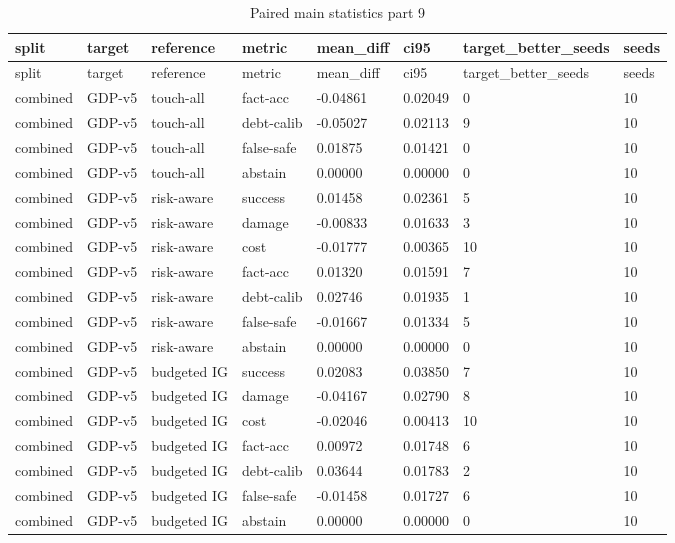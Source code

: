 \documentclass{article}
\begin{document}
\begin{center}
\tiny
\renewcommand{\arraystretch}{0.92}
\setlength{\tabcolsep}{3pt}
\begin{longtable}{llllllll}
\caption{Paired main statistics part 9}\label{tab:paired-main-statistics-9}\\
\toprule
split & target & reference & metric & mean\_diff & ci95 & target\_better\_seeds & seeds \\
\midrule
\endfirsthead
\toprule
split & target & reference & metric & mean\_diff & ci95 & target\_better\_seeds & seeds \\
\midrule
\endhead
combined & GDP-v5 & touch-all & fact-acc & -0.04861 & 0.02049 & 0 & 10 \\
combined & GDP-v5 & touch-all & debt-calib & -0.05027 & 0.02113 & 9 & 10 \\
combined & GDP-v5 & touch-all & false-safe & 0.01875 & 0.01421 & 0 & 10 \\
combined & GDP-v5 & touch-all & abstain & 0.00000 & 0.00000 & 0 & 10 \\
combined & GDP-v5 & risk-aware & success & 0.01458 & 0.02361 & 5 & 10 \\
combined & GDP-v5 & risk-aware & damage & -0.00833 & 0.01633 & 3 & 10 \\
combined & GDP-v5 & risk-aware & cost & -0.01777 & 0.00365 & 10 & 10 \\
combined & GDP-v5 & risk-aware & fact-acc & 0.01320 & 0.01591 & 7 & 10 \\
combined & GDP-v5 & risk-aware & debt-calib & 0.02746 & 0.01935 & 1 & 10 \\
combined & GDP-v5 & risk-aware & false-safe & -0.01667 & 0.01334 & 5 & 10 \\
combined & GDP-v5 & risk-aware & abstain & 0.00000 & 0.00000 & 0 & 10 \\
combined & GDP-v5 & budgeted IG & success & 0.02083 & 0.03850 & 7 & 10 \\
combined & GDP-v5 & budgeted IG & damage & -0.04167 & 0.02790 & 8 & 10 \\
combined & GDP-v5 & budgeted IG & cost & -0.02046 & 0.00413 & 10 & 10 \\
combined & GDP-v5 & budgeted IG & fact-acc & 0.00972 & 0.01748 & 6 & 10 \\
combined & GDP-v5 & budgeted IG & debt-calib & 0.03644 & 0.01783 & 2 & 10 \\
combined & GDP-v5 & budgeted IG & false-safe & -0.01458 & 0.01727 & 6 & 10 \\
combined & GDP-v5 & budgeted IG & abstain & 0.00000 & 0.00000 & 0 & 10 \\

\end{longtable}
\end{center}
\end{document}
